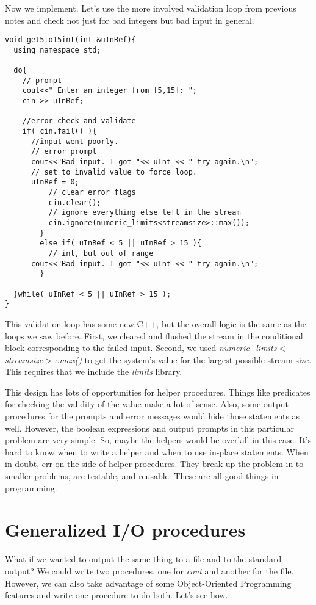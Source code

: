 \documentclass[]{tufte-handout}
\begin{document}
Now we implement. Let's use the more involved validation loop from previous notes and check not just for bad integers but bad input in general.
\begin{verbatim}
void get5to15int(int &uInRef){
  using namespace std;

  do{
    // prompt
    cout<<" Enter an integer from [5,15]: ";
    cin >> uInRef;
    
    //error check and validate
    if( cin.fail() ){
      //input went poorly. 
      // error prompt
      cout<<"Bad input. I got "<< uInt << " try again.\n";
      // set to invalid value to force loop.
      uInRef = 0;
    	  // clear error flags 
    	  cin.clear();
    	  // ignore everything else left in the stream
    	  cin.ignore(numeric_limits<streamsize>::max());
    	}
    	else if( uInRef < 5 || uInRef > 15 ){
    	  // int, but out of range
      cout<<"Bad input. I got "<< uInt << " try again.\n";
    	}
    
  }while( uInRef < 5 || uInRef > 15 );
}
\end{verbatim}
This validation loop has some new C++, but the overall logic is the same as the loops we saw before. First, we cleared and flushed the stream in the conditional block corresponding to the failed input. Second, we used \textit{numeric\_limits$<$streamsize$>$::max()} to get the system's value for the largest possible stream size.  This requires that we include the \textit{limits} library.  

This design has lots of opportunities for helper procedures. Things like predicates for checking the validity of the value make a lot of sense. Also, some output procedures for the prompts and error messages would hide those statements as well.  However, the boolean expressions and output prompts in this particular problem are very simple. So, maybe the helpers would be overkill in this case.  It's hard to know when to write a helper and when to use in-place statements. When in doubt, err on the side of helper procedures. They break up the problem in to smaller problems, are testable, and reusable.  These are all good things in programming.

\section{Generalized I/O procedures}

What if we wanted to output the same thing to a file and to the standard output? We could write two procedures, one for \textit{cout} and another for the file. However, we can also take advantage of some Object-Oriented Programming features and write one procedure to do both.  Let's see how.
\end{document}
